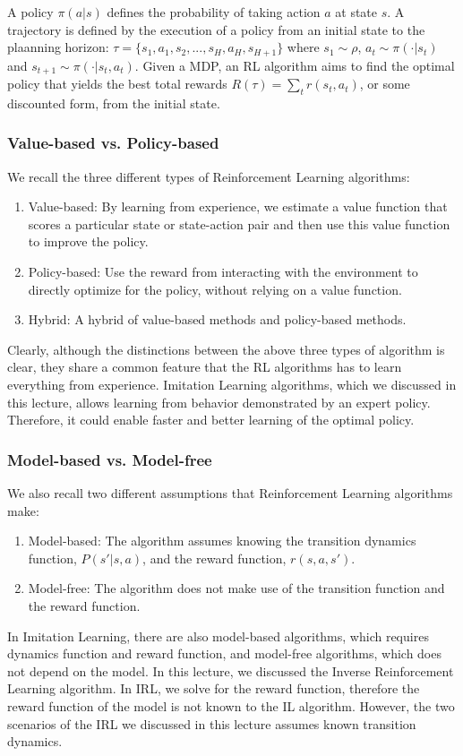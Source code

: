 \documentclass[11pt]{article}
\begin{document}
A policy $\pi(a|s)$ defines the probability of taking action $a$ at state $s$. A trajectory is defined by the execution of a policy from an initial state to the plaanning horizon: $\tau=\{s_1,a_1,s_2,...,s_H,a_H,s_{H+1}\}$ where $s_1\sim \rho$, $a_t\sim \pi(\cdot|s_t)$ and $s_{t+1}\sim \pi(\cdot|s_t, a_t)$. Given a MDP, an RL algorithm aims to find the optimal policy that yields the best total rewards $R(\tau) = \sum_tr(s_t,a_t)$, or some discounted form, from the initial state.

\subsubsection{Value-based vs. Policy-based}
We recall the three different types of Reinforcement Learning algorithms:
\begin{enumerate}
    \item Value-based: By learning from experience, we estimate a value function that scores a particular state or state-action pair and then use this value function to improve the policy.
    \item Policy-based: Use the reward from interacting with the environment to directly optimize for the policy, without relying on a value function.
    \item Hybrid: A hybrid of value-based methods and policy-based methods.
\end{enumerate}
Clearly, although the distinctions between the above three types of algorithm is clear, they share a common feature that the RL algorithms has to learn everything from experience. Imitation Learning algorithms, which we discussed in this lecture, allows learning from behavior demonstrated by an expert policy. Therefore, it could enable faster and better learning of the optimal policy. 

\subsubsection{Model-based vs. Model-free}
We also recall two different assumptions that Reinforcement Learning algorithms make:
\begin{enumerate}
    \item Model-based: The algorithm assumes knowing the transition dynamics function, $P(s'|s,a)$, and the reward function, $r(s,a,s')$.
    \item Model-free: The algorithm does not make use of the transition function and the reward function.
\end{enumerate}
In Imitation Learning, there are also model-based algorithms, which requires dynamics function and reward function, and model-free algorithms, which does not depend on the model. In this lecture, we discussed the Inverse Reinforcement Learning algorithm. In IRL, we solve for the reward function, therefore the reward function of the model is not known to the IL algorithm. However, the two scenarios of the IRL we discussed in this lecture assumes known transition dynamics.
\end{document}
